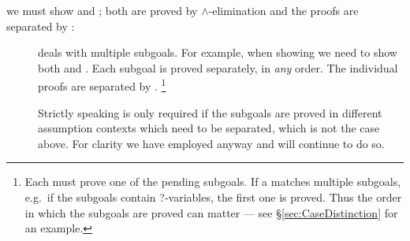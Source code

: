 \begin{isabellebody}
\begin{isamarkuptext}
we must show  and ; both are proved by
$\land$-elimination and the proofs are separated by :
\begin{description}
\item[] deals with multiple subgoals. For example,
when showing  we need to show both  and .  Each subgoal is proved separately, in \emph{any} order. The
individual proofs are separated by .  \footnote{Each
 must prove one of the pending subgoals.  If a
 matches multiple subgoals, e.g.\ if the subgoals
contain ?-variables, the first one is proved. Thus the order in which
the subgoals are proved can matter --- see
\S\ref{sec:CaseDistinction} for an example.}

Strictly speaking  is only required if the subgoals
are proved in different assumption contexts which need to be
separated, which is not the case above. For clarity we
have employed  anyway and will continue to do so.
\end{description}


\end{isamarkuptext}
\end{isabellebody}
